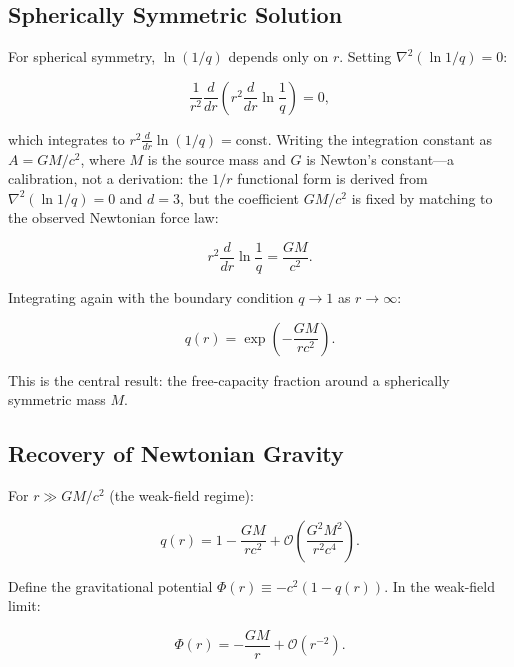 \documentclass[aps,prd,twocolumn,showpacs,superscriptaddress,preprintnumbers]{revtex4-2}
\begin{document}
\subsection{Spherically Symmetric Solution}

For spherical symmetry, $\ln(1/q)$ depends only on $r$.
Setting $\nabla^2(\ln 1/q)=0$:

\begin{equation}
\frac{1}{r^2}\frac{d}{dr}\left(r^2 \frac{d}{dr}\ln\frac{1}{q}\right) = 0,
\label{eq:ode}
\end{equation}

which integrates to $r^2\frac{d}{dr}\ln(1/q)=\text{const}$.
Writing the integration constant as $A = GM/c^2$, where $M$ is the source mass and $G$ is Newton's constant---a calibration, not a derivation: the $1/r$ functional form is derived from $\nabla^2(\ln 1/q)=0$ and $d=3$, but the coefficient $GM/c^2$ is fixed by matching to the observed Newtonian force law:

\begin{equation}
r^2 \frac{d}{dr}\ln\frac{1}{q} = \frac{GM}{c^2}.
\label{eq:first_int}
\end{equation}

Integrating again with the boundary condition $q\to1$ as $r\to\infty$:

\begin{equation}
\boxed{q(r) = \exp\left(-\frac{GM}{rc^2}\right)}.
\label{eq:q_solution}
\end{equation}

This is the central result: the free-capacity fraction around a spherically symmetric mass $M$.

\subsection{Recovery of Newtonian Gravity}

For $r\gg GM/c^2$ (the weak-field regime):

\begin{equation}
q(r) = 1 - \frac{GM}{rc^2} + \mathcal{O}\left(\frac{G^2 M^2}{r^2 c^4}\right).
\label{eq:q_expand}
\end{equation}

Define the gravitational potential $\Phi(r)\equiv-c^2(1-q(r))$.
In the weak-field limit:

\begin{equation}
\boxed{\Phi(r) = -\frac{GM}{r} + \mathcal{O}(r^{-2})}.
\label{eq:newton}
\end{equation}
\end{document}
